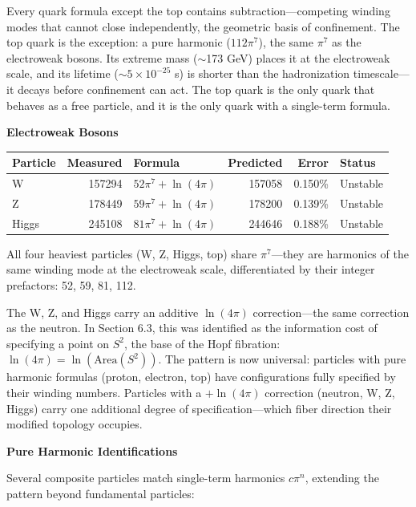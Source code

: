 \documentclass[12pt]{article}
\begin{document}
\medskip
Every quark formula except the top contains subtraction---competing winding modes that cannot close independently, the geometric basis of confinement. The top quark is the exception: a pure harmonic ($112\pi^7$), the same $\pi^7$ as the electroweak bosons. Its extreme mass ($\sim$173 GeV) places it at the electroweak scale, and its lifetime ($\sim 5 \times 10^{-25}$ s) is shorter than the hadronization timescale---it decays before confinement can act. The top quark is the only quark that behaves as a free particle, and it is the only quark with a single-term formula.

\bigskip
\textbf{Electroweak Bosons}

\medskip
\begin{center}
\begin{tabular}{l r l r r l}
\toprule
\textbf{Particle} & \textbf{Measured} & \textbf{Formula} & \textbf{Predicted} & \textbf{Error} & \textbf{Status} \\
\midrule
W & 157294 & $52\pi^7 + \ln(4\pi)$ & 157058 & 0.150\% & Unstable \\
Z & 178449 & $59\pi^7 + \ln(4\pi)$ & 178200 & 0.139\% & Unstable \\
Higgs & 245108 & $81\pi^7 + \ln(4\pi)$ & 244646 & 0.188\% & Unstable \\
\bottomrule
\end{tabular}
\end{center}

\medskip
All four heaviest particles (W, Z, Higgs, top) share $\pi^7$---they are harmonics of the same winding mode at the electroweak scale, differentiated by their integer prefactors: 52, 59, 81, 112.

The W, Z, and Higgs carry an additive $\ln(4\pi)$ correction---the same correction as the neutron. In Section 6.3, this was identified as the information cost of specifying a point on $S^2$, the base of the Hopf fibration: $\ln(4\pi) = \ln(\mathrm{Area}(S^2))$. The pattern is now universal: particles with pure harmonic formulas (proton, electron, top) have configurations fully specified by their winding numbers. Particles with a $+\ln(4\pi)$ correction (neutron, W, Z, Higgs) carry one additional degree of specification---which fiber direction their modified topology occupies. 

\bigskip
\textbf{Pure Harmonic Identifications}

\medskip
Several composite particles match single-term harmonics $c\pi^n$, extending the pattern beyond fundamental particles:
\end{document}
